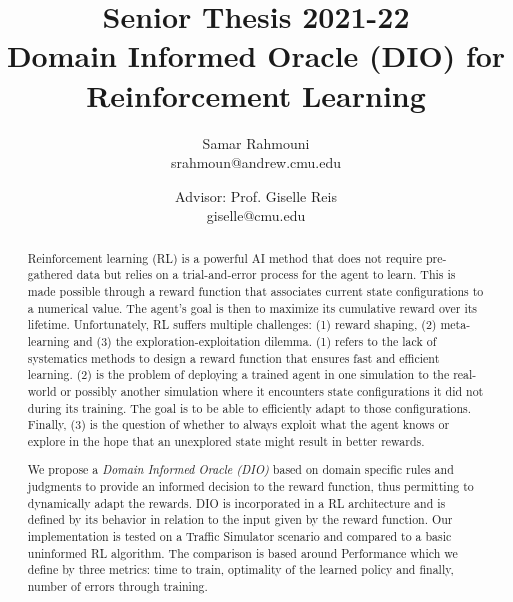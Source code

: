 \documentclass[a4paper,11pt]{article}
\author{%
  \begin{minipage}[t]{0.47\textwidth}
    \centering
    Samar Rahmouni \\ srahmoun@andrew.cmu.edu
  \end{minipage}
  \and
  \begin{minipage}[t]{0.45\textwidth}
    \centering
    Advisor: Prof. Giselle Reis \\ giselle@cmu.edu
  \end{minipage}%
  \vspace*{2ex}
}
\date{}
\title{{\Large\sc Senior Thesis 2021-22\\[2ex]}{\LARGE\bf Domain Informed Oracle (DIO) for Reinforcement Learning\vspace*{3ex}}}
\theoremstyle{definition}
\begin{document}
\maketitle 

\begin{abstract} Reinforcement learning (RL) is a powerful AI method that does not require pre-gathered data but 
  relies on a trial-and-error process for the agent to learn. This is made possible through a reward function that associates 
  current state configurations to a numerical value. The agent's goal is then to maximize its cumulative reward over its lifetime. 
  Unfortunately, RL suffers multiple challenges: (1) reward shaping, (2) meta-learning and (3) the exploration-exploitation dilemma. 
  (1) refers to the lack of systematics methods to design a reward function that ensures fast and efficient learning. (2) is the problem of 
  deploying a trained agent in one simulation to the real-world or possibly another simulation where it encounters 
  state configurations it did not during its training. The goal is to be able to efficiently adapt to those configurations. Finally, (3) 
  is the question of whether to always exploit what the agent knows or explore in the hope that an unexplored state 
  might result in better rewards. 

  \medskip 

  We propose a \emph{Domain Informed Oracle (DIO)} based on domain specific rules and judgments to provide 
  an informed decision to the reward function, thus permitting to dynamically adapt the rewards. DIO is incorporated 
  in a RL architecture and is defined by its behavior in relation to the input given by the reward function. 
  Our implementation is tested on a Traffic Simulator scenario and compared to a basic uninformed RL algorithm. The comparison 
  is based around Performance which we define by three metrics: time to train, optimality of the learned policy and finally, number of errors through training. 
  
\end{abstract}
\end{document}
